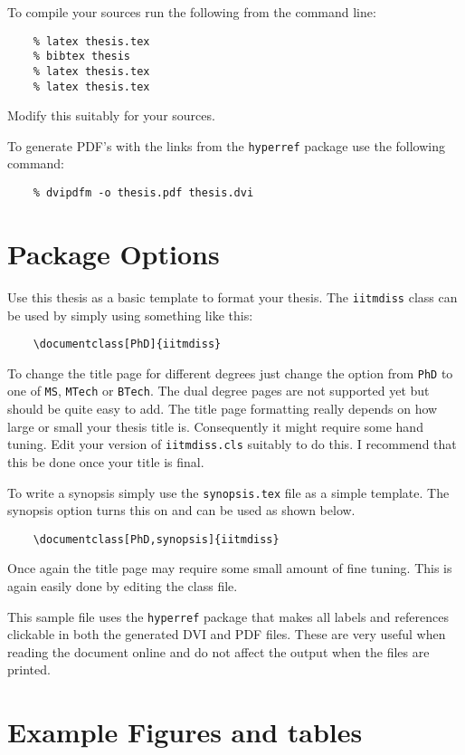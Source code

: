 	To compile your sources run the following from the command line:
	\begin{verbatim}
	% latex thesis.tex
	% bibtex thesis
	% latex thesis.tex
	% latex thesis.tex
	\end{verbatim}
	Modify this suitably for your sources.
	
	To generate PDF's with the links from the \verb+hyperref+ package use
	the following command:
	\begin{verbatim}
	% dvipdfm -o thesis.pdf thesis.dvi
	\end{verbatim}
	
	\section{Package Options}
	
	Use this thesis as a basic template to format your thesis.  The
	\verb+iitmdiss+ class can be used by simply using something like this:
	\begin{verbatim}
	\documentclass[PhD]{iitmdiss}  
	\end{verbatim}
	
	To change the title page for different degrees just change the option
	from \verb+PhD+ to one of \verb+MS+, \verb+MTech+ or \verb+BTech+.
	The dual degree pages are not supported yet but should be quite easy
	to add.  The title page formatting really depends on how large or
	small your thesis title is.  Consequently it might require some hand
	tuning.  Edit your version of \verb+iitmdiss.cls+ suitably to do this.
	I recommend that this be done once your title is final.
	
	To write a synopsis simply use the \verb+synopsis.tex+ file as a
	simple template.  The synopsis option turns this on and can be used as
	shown below.
	\begin{verbatim}
	\documentclass[PhD,synopsis]{iitmdiss}                                
	\end{verbatim}
	
	Once again the title page may require some small amount of fine
	tuning.  This is again easily done by editing the class file.
	
	This sample file uses the \verb+hyperref+ package that makes all
	labels and references clickable in both the generated DVI and PDF
	files.  These are very useful when reading the document online and do
	not affect the output when the files are printed.
	
	
	\section{Example Figures and tables}
	
